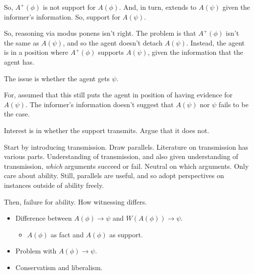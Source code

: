 \documentclass[10pt]{article}
\begin{document}
\begin{note}
  So, \(A^{+}(\phi)\) is not support for \(A(\phi)\).
  And, in turn, extends to \(A(\psi)\) given the informer's information.
  So, support for \(A(\psi)\).

  So, reasoning via modus ponens isn't right.
  The problem is that \(A^{+}(\phi)\) isn't the same as \(A(\psi)\), and so the agent doesn't detach \(A(\psi)\).
  Instead, the agent is in a position where \(A^{+}(\phi)\) supports \(A(\psi)\), given the information that the agent has.

  The issue is whether the agent gets \(\psi\).

  For, assumed that this still puts the agent in position of having evidence for \(A(\psi)\).
  The informer's information doesn't suggest that \(A(\psi)\) nor \(\psi\) fails to be the case.

  Interest is in whether the support transmits.
  Argue that it does not.
\end{note}

\begin{note}
  Start by introducing transmission.
  Draw parallels.
  Literature on transmission has various parts.
  Understanding of transmission, and also given understanding of transmission, \emph{which} arguments succeed or fail.
  Neutral on which arguments.
  Only care about ability.
  Still, parallels are useful, and so adopt perspectives on instances outside of ability freely.

  Then, failure for ability.
  How witnessing differs.
\end{note}

\begin{note}[Sketch]
  \begin{itemize}
  \item Difference between \(A(\phi) \rightarrow \psi\) and \(W(A(\phi)) \rightarrow \psi\).
    \begin{itemize}
    \item \(A(\phi)\) as fact and \(A(\phi)\) as support.
    \end{itemize}
  \item Problem with \(A(\phi) \rightarrow \psi\).
  \item Conservatism and liberalism.
  \end{itemize}
\end{note}
\end{document}
